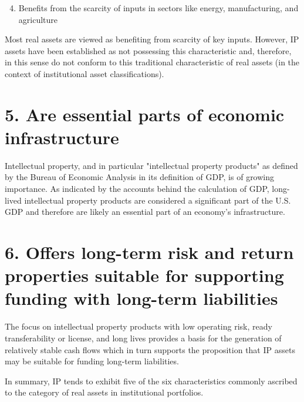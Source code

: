\documentclass[11pt]{article}
\begin{document}
\begin{enumerate}
  \setcounter{enumi}{3}
  \item Benefits from the scarcity of inputs in sectors like energy, manufacturing, and agriculture
\end{enumerate}

Most real assets are viewed as benefiting from scarcity of key inputs. However, IP assets have been established as not possessing this characteristic and, therefore, in this sense do not conform to this traditional characteristic of real assets (in the context of institutional asset classifications).

\section*{5. Are essential parts of economic infrastructure}
Intellectual property, and in particular "intellectual property products" as defined by the Bureau of Economic Analysis in its definition of GDP, is of growing importance. As indicated by the accounts behind the calculation of GDP, long-lived intellectual property products are considered a significant part of the U.S. GDP and therefore are likely an essential part of an economy's infrastructure.

\section*{6. Offers long-term risk and return properties suitable for supporting funding with long-term liabilities}
The focus on intellectual property products with low operating risk, ready transferability or license, and long lives provides a basis for the generation of relatively stable cash flows which in turn supports the proposition that IP assets may be suitable for funding long-term liabilities.

In summary, IP tends to exhibit five of the six characteristics commonly ascribed to the category of real assets in institutional portfolios.
\end{document}
